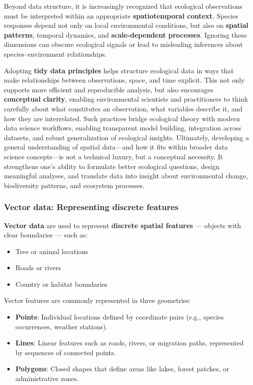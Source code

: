 \documentclass[
]{book}
\providecommand{\tightlist}{%
  \setlength{\itemsep}{0pt}\setlength{\parskip}{0pt}}
\begin{document}
Beyond data structure, it is increasingly recognized that ecological
observations must be interpreted within an appropriate
\textbf{spatiotemporal context}. Species responses depend not only on
local environmental conditions, but also on \textbf{spatial patterns},
temporal dynamics, and \textbf{scale-dependent processes}. Ignoring
these dimensions can obscure ecological signals or lead to misleading
inferences about species--environment relationships.

Adopting \textbf{tidy data principles} helps structure ecological data
in ways that make relationships between observations, space, and time
explicit. This not only supports more efficient and reproducible
analysis, but also encourages \textbf{conceptual clarity}, enabling
environmental scientists and practitioners to think carefully about what
constitutes an observation, what variables describe it, and how they are
interrelated. Such practices bridge ecological theory with modern data
science workflows, enabling transparent model building, integration
across datasets, and robust generalization of ecological insights.
Ultimately, developing a general understanding of spatial data---and how
it fits within broader data science concepts---is not a technical
luxury, but a conceptual necessity. It strengthens one's ability to
formulate better ecological questions, design meaningful analyses, and
translate data into insight about environmental change, biodiversity
patterns, and ecosystem processes.

\subsubsection{Vector data: Representing discrete
features}\label{vector-data-representing-discrete-features}

\textbf{Vector data} are used to represent \textbf{discrete spatial
features} --- objects with clear boundaries --- such as:

\begin{itemize}
\tightlist
\item
  Tree or animal locations\\
\item
  Roads or rivers\\
\item
  Country or habitat boundaries
\end{itemize}

Vector features are commonly represented in three geometries:

\begin{itemize}
\item
  \textbf{Points}: Individual locations defined by coordinate pairs
  (e.g., species occurrences, weather stations).
\item
  \textbf{Lines}: Linear features such as roads, rivers, or migration
  paths, represented by sequences of connected points.
\item
  \textbf{Polygons}: Closed shapes that define areas like lakes, forest
  patches, or administrative zones.
\end{itemize}
\end{document}
